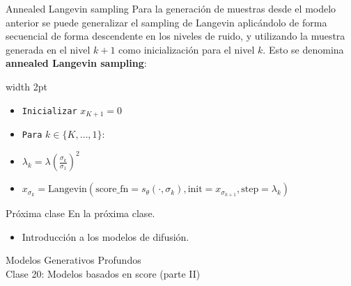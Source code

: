 \documentclass{beamer}
\begin{document}
\begin{frame}{Annealed Langevin sampling}
    Para la generación de muestras desde el modelo anterior se puede generalizar el sampling de Langevin aplicándolo de forma secuencial de forma descendente en los niveles de ruido, y utilizando la muestra generada en el nivel $k+1$ como inicialización para el nivel $k$. Esto se denomina \textbf{annealed Langevin sampling}:

    \hspace{0.5cm}\vrule width 2pt\hspace{0.3cm}%
    \begin{minipage}[t]{0.85\textwidth}
        {\small
            \begin{itemize}
                \item[] \texttt{Inicializar} $x_{K+1}=0$
                \item[] \texttt{Para} $k\in\{K,\ldots,1\}$:
                \item[] \quad $\lambda_k = \lambda \left(\frac{\sigma_k}{\sigma_1}\right)^2$
                \item[] \quad  $x_{\sigma_k}\!=\!\text{Langevin}(\text{score\_fn}\!=\!s_\theta(\cdot,\sigma_k),\text{init}\!=\!x_{\sigma_{k+1}},\text{step}\!=\!\lambda_k)$
            \end{itemize}}
    \end{minipage}
\end{frame}

\begin{frame}{Próxima clase}
    En la próxima clase.
    \begin{itemize}
        \item Introducción a los modelos de difusión.
    \end{itemize}
\end{frame}

\begin{frame}
    \centering
    \Large{Modelos Generativos Profundos}\\
    \large{Clase 20: Modelos basados en score (parte II)}
\end{frame}
\end{document}

